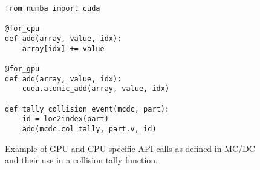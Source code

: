 
\begin{figure}
\begin{verbatim}
from numba import cuda

@for_cpu
def add(array, value, idx):
    array[idx] += value

@for_gpu
def add(array, value, idx):
    cuda.atomic_add(array, value, idx)

def tally_collision_event(mcdc, part):
    id = loc2index(part)
    add(mcdc.col_tally, part.v, id)
\end{verbatim}
\caption{Example of GPU and CPU specific API calls as defined in MC/DC and their use in a collision tally function.}
\label{fig:forcpuvgpu}

\end{figure}